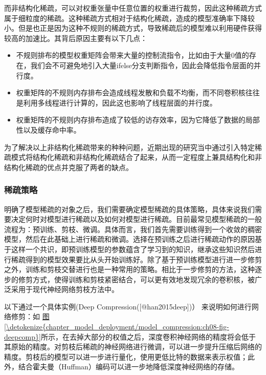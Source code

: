 \documentclass[letterpaper,10pt,english]{sphinxmanual}
\begin{document}
\sphinxAtStartPar
而非结构化稀疏，可以对权重张量中任意位置的权重进行裁剪，因此这种稀疏方式属于细粒度的稀疏。这种稀疏方式相对于结构化稀疏，造成的模型准确率下降较小。但是也正是因为这种不规则的稀疏方式，导致稀疏后的模型难以利用硬件获得较高的加速比。其背后原因主要有以下几点：
\begin{itemize}
\item {} 
\sphinxAtStartPar
不规则排布的模型权重矩阵会带来大量的控制流指令，比如由于大量0值的存在，我们会不可避免地引入大量if\sphinxhyphen{}else分支判断指令，因此会降低指令层面的并行度。

\item {} 
\sphinxAtStartPar
权重矩阵的不规则内存排布会造成线程发散和负载不均衡，而不同卷积核往往是利用多线程进行计算的，因此这也影响了线程层面的并行度。

\item {} 
\sphinxAtStartPar
权重矩阵的不规则内存排布造成了较低的访存效率，因为它降低了数据的局部性以及缓存命中率。

\end{itemize}

\sphinxAtStartPar
为了解决以上非结构化稀疏带来的种种问题，近期出现的研究当中通过引入特定稀疏模式将结构化稀疏和非结构化稀疏结合了起来，从而一定程度上兼具结构化和非结构化稀疏的优点并克服了两者的缺点。


\subsubsection{稀疏策略}
\label{\detokenize{chapter_model_deployment/model_compression:id8}}
\sphinxAtStartPar
明确了模型稀疏的对象之后，我们需要确定模型稀疏的具体策略，具体来说我们需要决定何时对模型进行稀疏以及如何对模型进行稀疏。目前最常见模型稀疏的一般流程为：预训练、剪枝、微调。具体而言，我们首先需要训练得到一个收敛的稠密模型，然后在此基础上进行稀疏和微调。选择在预训练之后进行稀疏动作的原因基于这样一个共识，即预训练模型的参数蕴含了学习到的知识，继承这些知识然后进行稀疏得到的模型效果要比从头开始训练好。除了基于预训练模型进行进一步修剪之外，训练和剪枝交替进行也是一种常用的策略。相比于一步修剪的方法，这种逐步的修剪方式，使得训练和剪枝紧密结合，可以更有效地发现冗余的卷积核，被广泛采用于现代神经网络剪枝方法中。

\sphinxAtStartPar
以下通过一个具体实例(Deep Compression({[}@han2015deep{]})）
来说明如何进行网络修剪：如
\hyperref[\detokenize{chapter_model_deployment/model_compression:ch08-fig-deepcomp}]{图\ref{\detokenize{chapter_model_deployment/model_compression:ch08-fig-deepcomp}}}所示，在去掉大部分的权值之后，深度卷积神经网络的精度将会低于其原始的精度。对剪枝后稀疏的神经网络进行微调，可以进一步提升压缩后网络的精度。剪枝后的模型可以进一步进行量化，使用更低比特的数据来表示权值；此外，结合霍夫曼（Huffman）编码可以进一步地降低深度神经网络的存储。
\end{document}
